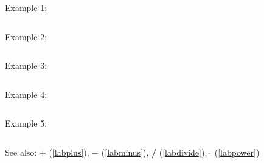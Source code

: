 \noindent Example 1: 
\begin{center}\begin{minipage}{15cm}\begin{Verbatim}[frame=single]
\end{Verbatim}
\end{minipage}\end{center}
\noindent Example 2: 
\begin{center}\begin{minipage}{15cm}\begin{Verbatim}[frame=single]
\end{Verbatim}
\end{minipage}\end{center}
\noindent Example 3: 
\begin{center}\begin{minipage}{15cm}\begin{Verbatim}[frame=single]
\end{Verbatim}
\end{minipage}\end{center}
\noindent Example 4: 
\begin{center}\begin{minipage}{15cm}\begin{Verbatim}[frame=single]
\end{Verbatim}
\end{minipage}\end{center}
\noindent Example 5: 
\begin{center}\begin{minipage}{15cm}\begin{Verbatim}[frame=single]
\end{Verbatim}
\end{minipage}\end{center}
See also: \textbf{$+$} (\ref{labplus}), \textbf{$-$} (\ref{labminus}), \textbf{/} (\ref{labdivide}), \textbf{$\mathbf{\hat{~}}$} (\ref{labpower})
